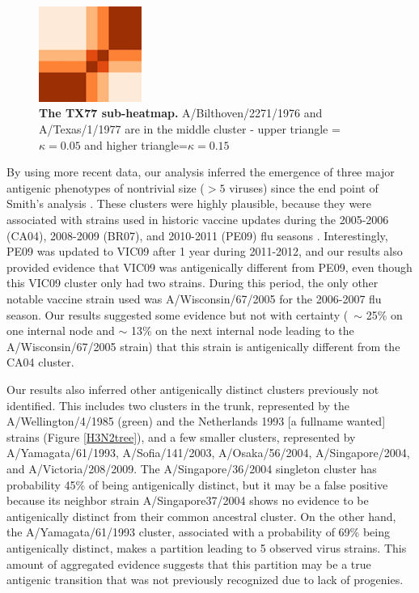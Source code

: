 \documentclass[11pt,oneside,letterpaper]{article}
\begin{document}
\begin{figure}[h]
	\centering		
	\includegraphics[width=0.3\textwidth]{figures/custom/H3N2heatmapTX77}
	\caption{\textbf{The TX77 sub-heatmap.} A/Bilthoven/2271/1976 and A/Texas/1/1977 are in the middle cluster - upper triangle = $\kappa=0.05$ and higher triangle=$\kappa=0.15$
	 		} 
	\label{TX77heatmap}  
\end{figure}



By using more recent data, our analysis inferred the emergence of three major antigenic phenotypes of nontrivial size ($>5$ viruses) since the end point of Smith's analysis \cite{smith_mapping_2004}.  
These clusters were highly plausible, because they were associated with strains used in historic vaccine updates during the 2005-2006 (CA04), 2008-2009 (BR07), and 2010-2011 (PE09) flu seasons \cite{WHO VACCINE REPORT}. 
Interestingly, PE09 was updated to VIC09 after 1 year during 2011-2012, and our results also provided evidence that VIC09 was antigenically different from PE09, even though this VIC09 cluster only had two strains.
During this period, the only other notable vaccine strain used was A/Wisconsin/67/2005 for the 2006-2007 flu season.
Our results suggested some evidence but not with certainty (~$\sim$ 25\% on one internal node and $\sim$ 13\% on the next internal node leading to the A/Wisconsin/67/2005 strain) that this strain is antigenically different from the CA04 cluster.

Our results also inferred other antigenically distinct clusters previously not identified. 
This includes two clusters in the trunk, represented by the A/Wellington/4/1985 (green) and the Netherlands 1993 [a fullname wanted] strains (Figure \ref{H3N2tree}), and a few smaller clusters, represented by A/Yamagata/61/1993, A/Sofia/141/2003, A/Osaka/56/2004,  A/Singapore/2004, and A/Victoria/208/2009. 
The A/Singapore/36/2004 singleton cluster has probability 45\% of being antigenically distinct, but it may be a false positive because its neighbor strain A/Singapore37/2004  shows no evidence to be antigenically distinct from their common ancestral cluster. 
On the other hand, the A/Yamagata/61/1993 cluster, associated with a probability of 69\% being antigenically distinct, makes a partition leading to 5 observed virus strains.
This amount of aggregated evidence suggests that this partition may be a true antigenic transition that was not previously recognized due to lack of progenies. 
\end{document}
